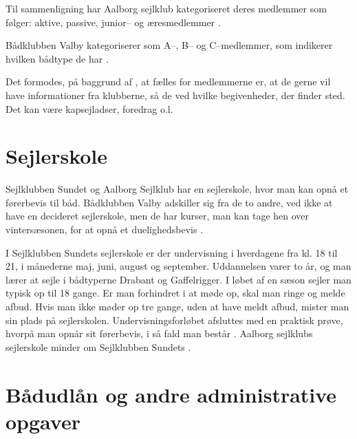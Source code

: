 Til sammenligning har Aalborg sejlklub kategoriseret deres medlemmer som følger: aktive, passive, junior-- og æresmedlemmer \citep{aalborg_sejlklub_vedtaegter}.

Bådklubben Valby kategoriserer som A--, B-- og C--medlemmer, som indikerer hvilken bådtype de har \citep{badklubben_valby_love}.

Det formodes, på baggrund af , at fælles for medlemmerne er, at de gerne vil have informationer fra klubberne, så de ved hvilke begivenheder, der finder sted. 
Det kan være kapsejladser, foredrag o.l.


\section{Sejlerskole}\label{sec:sejlerskole}

Sejlklubben Sundet og Aalborg Sejlklub har en sejlerskole, hvor man kan opnå et førerbevis til båd. 
Bådklubben Valby adskiller sig fra de to andre, ved ikke at have en decideret sejlerskole, men de har kurser, man kan tage hen over vintersæsonen, for at opnå et duelighedsbevis \citep{baedklubben_valby_duelighedsbevis}.

I Sejlklubben Sundets sejlerskole er der undervisning i hverdagene fra kl. 18 til 21, i månederne maj, juni, august og september. 
Uddannelsen varer to år, og man lærer at sejle i bådtyperne Drabant og Gaffelrigger. 
I løbet af en sæson sejler man typisk op til 18 gange. 
Er man forhindret i at møde op, skal man ringe og melde afbud.
Hvis man ikke møder op tre gange, uden at have meldt afbud, mister man sin plads på sejlerskolen.
Undervisningsforløbet afsluttes med en praktisk prøve, hvorpå man opnår sit førerbevis, i så fald man består \citep{Sundet}. 
Aalborg sejlklubs sejlerskole minder om Sejlklubben Sundets \citep{aalborg_sejlklub_sejlerskole}.


\section{Bådudlån og andre administrative opgaver}\label{subsec:bådudlån}

